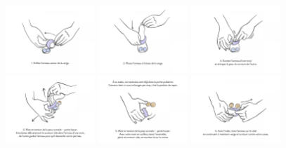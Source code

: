\documentclass[12pt,a4paper]{report}
\begin{document}
\begin{figure}[h]
    \centering
    \includegraphics[width=0.3\textwidth]{images/scientiphique/Tuto_andro_switch/1.png}
    \includegraphics[width=0.3\textwidth]{images/scientiphique/Tuto_andro_switch/2.png}
    \includegraphics[width=0.3\textwidth]{images/scientiphique/Tuto_andro_switch/3.png}
    \includegraphics[width=0.3\textwidth]{images/scientiphique/Tuto_andro_switch/4.png}
    \includegraphics[width=0.3\textwidth]{images/scientiphique/Tuto_andro_switch/5.png}
    \includegraphics[width=0.3\textwidth]{images/scientiphique/Tuto_andro_switch/6.png}

\end{figure}
\end{document}
